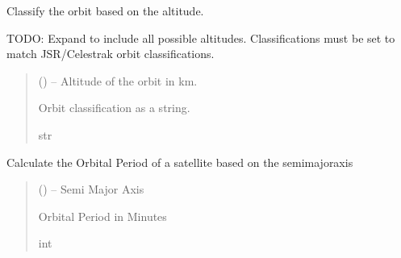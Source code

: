 \documentclass[letterpaper,10pt,english]{sphinxmanual}
\begin{document}

\begin{fulllineitems}
\label{\detokenize{fspsim.utils:fspsim.utils.Conversions.orbit_classify}}
\pysigstartsignatures
{}
\pysigstopsignatures
\sphinxAtStartPar
Classify the orbit based on the altitude.

\sphinxAtStartPar
TODO: Expand to include all possible altitudes. Classifications must be set to match JSR/Celestrak orbit classifications.
\begin{quote}\begin{description}
\sphinxAtStartPar
{} () – Altitude of the orbit in km.

\sphinxAtStartPar
Orbit classification as a string.

\sphinxAtStartPar
str

\end{description}\end{quote}

\end{fulllineitems}


\begin{fulllineitems}
\label{\detokenize{fspsim.utils:fspsim.utils.Conversions.orbital_period}}
\pysigstartsignatures
{}
\pysigstopsignatures
\sphinxAtStartPar
Calculate the Orbital Period of a satellite based on the semi\sphinxhyphen{}major\sphinxhyphen{}axis
\begin{quote}\begin{description}
\sphinxAtStartPar
{} () – Semi Major Axis

\sphinxAtStartPar
Orbital Period in Minutes

\sphinxAtStartPar
int

\end{description}\end{quote}

\end{fulllineitems}
\end{document}
